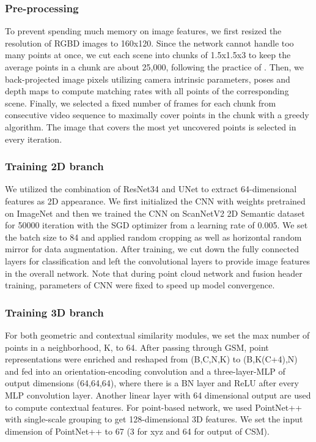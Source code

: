 \documentclass[letterpaper, 10 pt, conference]{ieeeconf}
\begin{document}
\subsubsection{\textbf{Pre-processing}}

To prevent spending much memory on image features, we first resized the resolution of RGBD images to 160x120. 
Since the network cannot handle too many points at once, we cut each scene into chunks of 1.5x1.5x3  to keep the average points in a chunk are about 25,000, following the practice of \cite{qi2017pointnet,qi2017pointnet++}.
Then, we back-projected image pixels utilizing camera intrinsic parameters, poses and depth maps to compute matching rates with all points of the corresponding scene. 
Finally, we selected a fixed number of frames for each chunk from consecutive video sequence to maximally cover points in the chunk with a greedy algorithm. The image that covers the most yet uncovered points is selected in every iteration.


\subsubsection{\textbf{Training 2D branch}}
We utilized the combination of ResNet34 \cite{he2016deep} and UNet \cite{ronneberger2015u} to extract 64-dimensional features as 2D appearance. We first initialized the CNN with weights pretrained on ImageNet and then we trained the CNN on ScanNetV2 2D Semantic dataset for 50000 iteration with the SGD optimizer from a learning rate of 0.005. We set the batch size to 84 and applied random cropping as well as horizontal random mirror for data augmentation. After training, we cut down the fully connected layers for classification and left the convolutional layers to provide image features in the overall network. Note that during point cloud network and fusion header training, parameters of CNN were fixed to speed up model convergence.

\subsubsection{\textbf{Training 3D branch}}
For both geometric and contextual similarity modules, we set the max number of points in a neighborhood, K, to 64. After passing through GSM, point representations were enriched and reshaped from (B,C,N,K) to (B,K(C+4),N) and fed into an orientation-encoding convolution and a three-layer-MLP of output dimensions (64,64,64), where there is a BN layer and ReLU after every MLP convolution layer. Another linear layer with 64 dimensional output are used to compute contextual features.
For point-based network, we used PointNet++ with single-scale grouping to get 128-dimensional 3D features. We set the input dimension of PointNet++ to 67 (3 for xyz and 64 for output of CSM).
\end{document}
